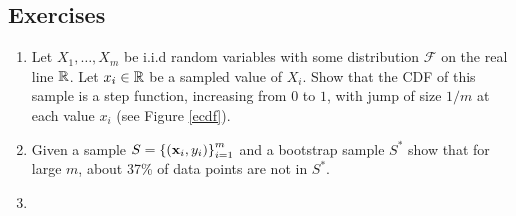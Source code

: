 \subsection{Exercises}
\begin{enumerate}
	\item Let $X_1,\ldots,X_m$ be i.i.d random variables with some distribution $\mathcal{F}$ on the real line $\mathbb{R}$. Let $x_i\in\mathbb{R}$ be a sampled value of $X_i$. Show that the CDF of this sample is a step function, increasing from $0$ to $1$, with jump of size $1/m$ at each value $x_i$ (see Figure \ref{ecdf}).
	\item Given a sample $S=\left\{\left(\mathbf{x}_i,y_i\right)\right\}^m_{i=1}$ and a bootstrap sample $S^*$ show that for large $m$, about 37\% of data points are not in $S^*$.
	\item {}
\end{enumerate}